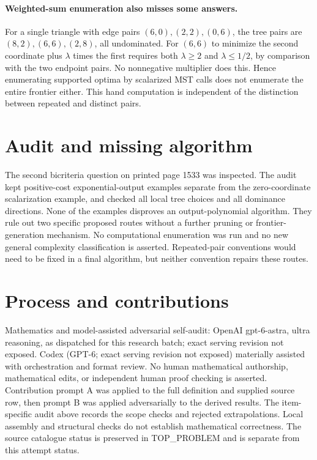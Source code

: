 \documentclass[11pt]{article}
\begin{document}
\paragraph{Weighted-sum enumeration also misses some answers.}
For a single triangle with edge pairs $(6,0),(2,2),(0,6)$,
the tree pairs are $(8,2),(6,6),(2,8)$, all undominated.
For $(6,6)$ to minimize the second coordinate plus $\lambda$
times the first requires both $\lambda\ge2$ and $\lambda\le1/2$,
by comparison with the two endpoint pairs. No nonnegative multiplier
does this. Hence enumerating supported optima by scalarized MST calls
does not enumerate the entire frontier either. This hand computation
is independent of the distinction between repeated and distinct pairs.

\section{Audit and missing algorithm}
The second bicriteria question on printed page 1533 was inspected.
The audit kept positive-cost exponential-output examples separate from
the zero-coordinate scalarization example, and checked all local tree
choices and all dominance directions. None of the examples disproves
an output-polynomial algorithm. They rule out two specific proposed
routes without a further pruning or frontier-generation mechanism.
No computational enumeration was run and no new general complexity
classification is asserted. Repeated-pair conventions would need to be
fixed in a final algorithm, but neither convention repairs these routes.

\section{Process and contributions}
Mathematics and model-assisted adversarial self-audit: OpenAI gpt-6-astra, ultra reasoning, as dispatched for this research batch; exact serving revision not exposed. Codex (GPT-6; exact serving revision not exposed) materially assisted with orchestration and format review. No human mathematical authorship, mathematical edits, or independent human proof checking is asserted.
Contribution prompt A was applied to the full definition and supplied source row, then prompt B was applied adversarially to the derived results. The item-specific audit above records the scope checks and rejected extrapolations. Local assembly and structural checks do not establish mathematical correctness. The source catalogue status is preserved in TOP\_PROBLEM and is separate from this attempt status.
\end{document}
